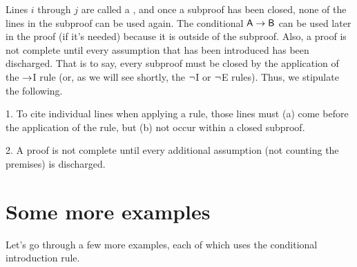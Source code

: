 Lines $i$ through $j$ are called a , and once a subproof has been closed, none of the lines in the subproof can be used again. The conditional $\mathsf{A}\rightarrow\mathsf{B}$ can be used later in the proof (if it's needed) because it is outside of the subproof. Also, a proof is not complete until every assumption that has been introduced has been discharged. That is to say, every subproof must be closed by the application of the $\rightarrow$I rule (or, as we will see shortly, the ${\neg}$I or ${\neg}$E rules).
Thus, we stipulate the following.
\begin{earg}
\item[1.] To cite individual lines when applying a rule, those lines must (a) come before the application of the rule, but (b) not occur within a closed subproof.
\item[2.] A proof is not complete until every additional assumption (not counting the premises) is discharged.
\end{earg}


\section{Some more examples}

Let's go through a few more examples, each of which uses the conditional introduction rule.

